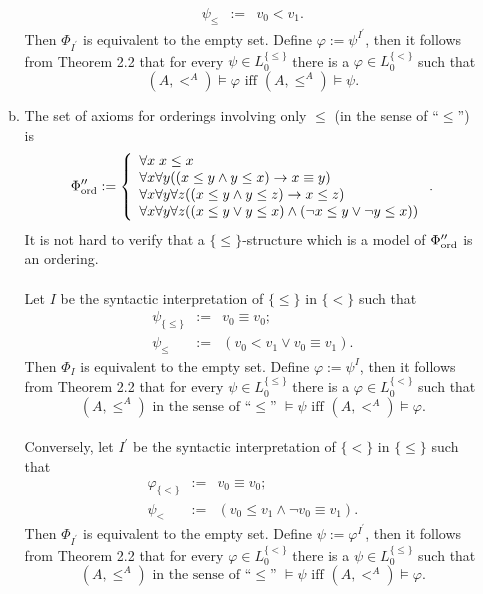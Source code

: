 \begin{enumerate}[1.]
\begin{enumerate}[(a)]
\[\begin{array}{lll}
\psi_\leq         & := & v_0 < v_1.
\end{array}
\]
Then $\Phi_{I^\prime}$ is equivalent to the empty set. Define $\varphi := \psi^{I^\prime}$, then it follows from Theorem 2.2 that for every $\psi \in L_0^{\{ \leq \}}$ there is a $\varphi \in L_0^{\{ < \}}$ such that
\[
\mbox{$(A, <^A) \models \varphi$ iff $(A, \leq^A) \models \psi$}.
\]
\item The set of axioms for orderings involving only $\leq$ (in the sense of ``$\leq$'') is
\[
\Phi^{\prime\prime}_{\mbox{\scriptsize ord}} := \left\{
\begin{array}{l}
\forall x \;x \leq x \\
\forall x \forall y ((x \leq y \land y \leq x) \rightarrow x \equiv y) \\
\forall x \forall y \forall z ((x \leq y \land y \leq z) \rightarrow x \leq z) \\
\forall x \forall y \forall z ((x \leq y \lor y \leq x) \land (\neg x \leq y \lor \neg y \leq x))
\end{array} \right. .
\]
It is not hard to verify that a $\{ \leq \}$-structure which is a model of $\Phi^{\prime\prime}_{\mbox{\scriptsize ord}}$ is an ordering.\\
\\
Let $I$ be the syntactic interpretation of $\{ \leq \}$ in $\{ < \}$ such that
\[
\begin{array}{lll}
\psi_{\{ \leq \}} & := & v_0 \equiv v_0; \\
\psi_\leq         & := & (v_0 < v_1 \lor v_0 \equiv v_1).
\end{array}
\]
Then $\Phi_I$ is equivalent to the empty set. Define $\varphi := \psi^I$, then it follows from Theorem 2.2 that for every $\psi \in L_0^{\{ \leq \}}$ there is a $\varphi \in L_0^{\{ < \}}$ such that
\[
\mbox{$(A, \leq^A)$ in the sense of ``$\leq$'' $\models \psi$ iff $(A, <^A) \models \varphi$}.
\]
\ 
\\
Conversely, let $I^\prime$ be the syntactic interpretation of $\{ < \}$ in $\{ \leq \}$ such that
\[
\begin{array}{lll}
\varphi_{\{ < \}} & := & v_0 \equiv v_0; \\
\psi_<            & := & (v_0 \leq v_1 \land \neg v_0 \equiv v_1).
\end{array}
\]
Then $\Phi_{I^\prime}$ is equivalent to the empty set. Define $\psi := \varphi^{I^\prime}$, then it follows from Theorem 2.2 that for every $\varphi \in L_0^{\{ < \}}$ there is a $\psi \in L_0^{\{ \leq \}}$ such that
\[
\mbox{$(A, \leq^A)$ in the sense of ``$\leq$'' $\models \psi$ iff $(A, <^A) \models \varphi$}.
\]
\end{enumerate}
\end{enumerate}
